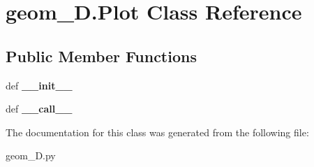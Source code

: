 \hypertarget{classgeom__2D_1_1Plot}{\section{geom\-\_\-D.\-Plot \-Class \-Reference}
\label{classgeom__2D_1_1Plot}
}
\subsection*{\-Public \-Member \-Functions}
\begin{DoxyCompactItemize}
\item 
\hypertarget{classgeom__2D_1_1Plot_a96970f188e819ad55f182e64a2bf6492}{def {\bfseries \-\_\-\-\_\-init\-\_\-\-\_\-}}\label{classgeom__2D_1_1Plot_a96970f188e819ad55f182e64a2bf6492}

\item 
\hypertarget{classgeom__2D_1_1Plot_ada98b489c39aa0bb5470c1529247500b}{def {\bfseries \-\_\-\-\_\-call\-\_\-\-\_\-}}\label{classgeom__2D_1_1Plot_ada98b489c39aa0bb5470c1529247500b}

\end{DoxyCompactItemize}


\-The documentation for this class was generated from the following file\-:\begin{DoxyCompactItemize}
\item 
geom\-\_\-D.\-py\end{DoxyCompactItemize}
